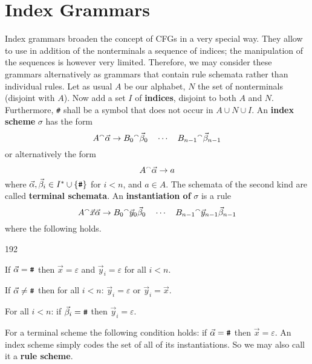 \section{Index Grammars}
\label{kap4-6}
%
%
%
Index grammars broaden the concept of CFGs in a very
special way. They allow to use in addition of the nonterminals a
sequence of indices; the manipulation of the sequences is however 
very limited. Therefore, we may consider these grammars alternatively 
as grammars that contain rule schemata rather than individual rules.
Let as usual $A$ be our alphabet, $N$ the set of nonterminals (disjoint 
with $A$). Now add a set $I$ of \textbf{indices}, disjoint to both $A$ 
and $N$. Furthermore, {\tt \#} shall be a symbol that does not occur in
$A \cup N \cup I$. An \textbf{index scheme} $\sigma$ has the
form
\begin{equation}
A {^{\smallfrown}} \vec{\alpha} \rightarrow
    B_0 {^{\smallfrown}} \vec{\beta}_0  \quad
    \dotsb \quad
    B_{n-1} {^{\smallfrown}} \vec{\beta}_{n-1}
\end{equation}
or alternatively the form
\begin{equation}
A {^{\smallfrown}} \vec{\alpha} \rightarrow a
\end{equation}
where $\vec{\alpha}, \vec{\beta}_i \in I^{\ast} \cup \{\mbox{\tt\#}\}$ 
for $i < n$, and $a \in A$. The schemata of the second kind are called
\textbf{terminal schemata}. An \textbf{instantiation of} $\sigma$ is
a rule
\begin{equation}
A {^{\smallfrown}} \vec{x}\vec{\alpha} \rightarrow
    B_0 {^{\smallfrown}} \vec{y}_0\vec{\beta}_0  \quad
    \dotsb \quad
    B_{n-1} {^{\smallfrown}} \vec{y}_{n-1}\vec{\beta}_{n-1}
\end{equation}
where the following holds.
\begin{dingautolist}{192}
\item If $\vec{\alpha} = \mbox{\tt\#}$ then $\vec{x} = \varepsilon$
    and $\vec{y}_i = \varepsilon$ for all $i < n$.
\item If $\vec{\alpha} \neq \mbox{\tt\#}$ then for all
    $i < n$: $\vec{y}_i = \varepsilon$ or $\vec{y}_i = \vec{x}$.
\item For all $i < n$: if $\vec{\beta}_i = \mbox{\tt\#}$ then $\vec{y}_i =
    \varepsilon$.
\end{dingautolist}
For a terminal scheme the following condition holds:
if $\vec{\alpha} = \mbox{\tt\#}$ then $\vec{x} = \varepsilon$.
An index scheme simply codes the set of all of its instantiations.
So we may also call it a \textbf{rule scheme}.
